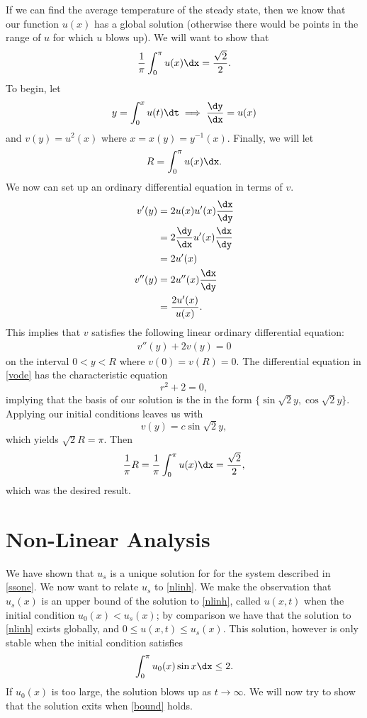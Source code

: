 \documentclass{hw}
\begin{document}
If we can find the average temperature of the steady state, then we know that our function $u(x)$
has a global solution (otherwise there would be points in the range of $u$ for which $u$ blows up).
We will want to show that
\[
{1\over\pi}\int_{0}^{\pi}u(x)\dx={\sqrt{2}\over2}.
\]
To begin, let
\[
y=\int_{0}^{x}u(t)\dt \implies {\dy\over\dx} = u(x)
\]
and $v(y)=u^{2}(x)$ where $x=x(y)=y^{-1}(x)$. Finally, we will let
\[
R=\int_{0}^{\pi}u(x)\dx.
\]
We now can set up an ordinary differential equation in terms of $v$.
\begin{align*}
v'(y)&=2u(x)u'(x){\dx\over\dy}\\
&= 2{\dy\over\dx}u'(x){\dx\over\dy}\\
&= 2u'(x)\\
v''(y)&= 2u''(x){\dx\over\dy}\\
&= {2u'(x)\over u(x)}.
\end{align*}
This implies that $v$ satisfies the following linear ordinary differential equation:
\begin{gather}\label{vode}
v''(y)+2v(y)=0
\end{gather}
on the interval $0<y<R$ where $v(0)=v(R)=0$. The differential equation in \eqref{vode} has the
characteristic equation
\[
r^{2}+2=0,
\]
implying that the basis of our solution is the in the form $\{\sin{\sqrt{2}y},\cos{\sqrt{2}y}\}$.
Applying our initial conditions leaves us with
\[
v(y)=c\sin{\sqrt{2}y},
\]
which yields $\sqrt{2}R=\pi$. Then
\[
{1\over\pi}R={1\over\pi}\int_{0}^{\pi}u(x)\dx={\sqrt{2}\over2},
\]
which was the desired result.

\section{Non-Linear Analysis}

We have shown that $u_{s}$ is a unique solution for for the system described in \eqref{ssone}. We now
want to relate $u_{s}$ to \eqref{nlinh}. We make the observation that $u_{s}(x)$ is an upper bound
of the solution to \eqref{nlinh}, called $u(x,t)$ when the initial condition $u_{0}(x)<u_{s}(x)$; by
comparison we have that the solution to \eqref{nlinh} exists globally, and
$0\leq u(x,t)\leq u_{s}(x)$. This solution, however is only stable when the initial condition
satisfies
\begin{equation}\label{bound}
\int_{0}^{\pi}u_{0}(x)\sin{x}\dx\leq2.
\end{equation}
If $u_{0}(x)$ is too large, the solution blows up as $t\to\infty$. We will now try to show that the
solution exits when \eqref{bound} holds.
\end{document}
